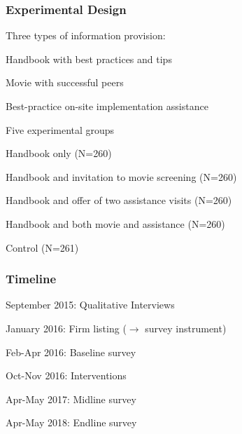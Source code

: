 \documentclass[hideothersubsections, usenames,dvipsnames,11pt]{beamer}
\newenvironment{itemize_3pt}{\itemize\addtolength{\itemsep}{3pt}}{\enditemize}
\newenvironment{enumerate_3pt}{\enumerate\addtolength{\itemsep}{3pt}}{\endenumerate}
\begin{document}
\begin{frame}
\frametitle{Experimental Design}
	\begin{itemize_3pt}
	\item Three types of information provision:
	\vspace{0.05in}
		\begin{itemize_3pt}
		\item \textcolor{bdf}{Handbook} with best practices and tips
		\item \textcolor{bdf}{Movie} with successful peers
		\item Best-practice on-site implementation \textcolor{bdf}{assistance}
		\end{itemize_3pt}
	\vspace{0.05in}
\end{itemize_3pt}
	\begin{itemize_3pt}
\item{Five experimental groups}
	\vspace{0.05in}
            \begin{enumerate_3pt}
              \item \textcolor{bdf}{Handbook} only (N=260)
              \item \textcolor{bdf}{Handbook} and invitation to \textcolor{bdf}{movie} screening (N=260)
              \item \textcolor{bdf}{Handbook} and offer of two \textcolor{bdf}{assistance} visits (N=260)
              \item \textcolor{bdf}{Handbook} and both \textcolor{bdf}{movie} and \textcolor{bdf}{assistance} (N=260)
              \item Control (N=261)
            \end{enumerate_3pt}
        \end{itemize_3pt}
\end{frame}


\begin{frame}
\frametitle{Timeline}
\begin{enumerate_3pt}
    \item September 2015: \textcolor{bdf}{Qualitative} Interviews
    \item January 2016: \textcolor{bdf}{Firm listing} ($\rightarrow$ survey instrument)
    \item Feb-Apr 2016: \textcolor{bdf}{Baseline} survey
    \item Oct-Nov 2016: \textcolor{bdf}{Interventions}
    \item Apr-May 2017: \textcolor{bdf}{Midline} survey
    \item Apr-May 2018: \textcolor{bdf}{Endline} survey
\end{enumerate_3pt}
\end{frame}
\end{document}
